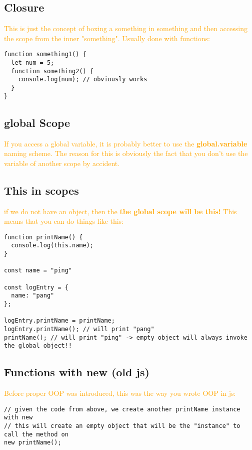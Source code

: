 \documentclass[main.tex,fontsize=6pt,paper=a4,paper=landscape,DIV=calc,]{scrartcl}
\begin{document}
\begin{multicols*}{4}
\subsection{Closure}  
\textcolor{orange}{This is just the concept of boxing a something in something and then accessing the scope from the inner "something". Usually done with functions:}\newline
\vspace{-2mm}
\begin{lstlisting}
function something1() {
  let num = 5;
  function something2() {
    console.log(num); // obviously works
  }
}
\end{lstlisting}
\vspace{2mm}

\subsection{global Scope}  
\textcolor{orange}{If you access a global variable, it is probably better to use the \textbf{global.variable} naming scheme. The reason for this is obviously the fact that you don't use the variable of another scope by accident.}

\subsection{This in scopes}  
\textcolor{orange}{if we do not have an object, then the \textbf{the global scope will be this!}\newline
This means that you can do things like this:}\newline
\vspace{-2mm}
\begin{lstlisting}
function printName() {
  console.log(this.name);
}

const name = "ping"

const logEntry = {
  name: "pang"
};

logEntry.printName = printName;
logEntry.printName(); // will print "pang"
printName(); // will print "ping" -> empty object will always invoke the global object!!
\end{lstlisting}
\vspace{2mm}

\subsection{Functions with new (old js)}  
\textcolor{orange}{Before proper OOP was introduced, this was the way you wrote OOP in js:}\newline
\vspace{-2mm}
\begin{lstlisting}
// given the code from above, we create another printName instance with new
// this will create an empty object that will be the "instance" to call the method on
new printName();


\end{lstlisting}
\end{multicols*}
\end{document}
